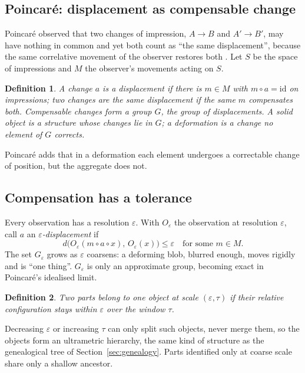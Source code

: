 \documentclass[11pt]{article}
\newtheorem{definition}{Definition}
\theoremstyle{remark}
\begin{document}
\subsection{Poincar\'e: displacement as compensable change}

Poincar\'e observed that two changes of impression, $A\to B$ and $A'\to B'$, may have nothing in common and yet
both count as ``the same displacement'', because the same correlative movement of the observer restores both
\cite{Poincare1902}. Let $S$ be the space of impressions and $M$ the observer's movements acting on $S$.

\begin{definition}
A change $a$ is a \emph{displacement} if there is $m\in M$ with $m\circ a=\mathrm{id}$ on impressions; two
changes are the same displacement if the same $m$ compensates both. Compensable changes form a group $G$, the
group of displacements. A \emph{solid object} is a structure whose changes lie in $G$; a \emph{deformation} is
a change no element of $G$ corrects.
\end{definition}

\noindent Poincar\'e adds that in a deformation each element undergoes a correctable change of position, but
the aggregate does not.

\subsection{Compensation has a tolerance}

Every observation has a resolution $\varepsilon$. With $O_\varepsilon$ the observation at resolution
$\varepsilon$, call $a$ an \emph{$\varepsilon$-displacement} if
\begin{equation}
  d\bigl(O_\varepsilon(m\circ a\circ x),\,O_\varepsilon(x)\bigr)\le\varepsilon\quad\text{for some }m\in M.
\end{equation}
The set $G_\varepsilon$ grows as $\varepsilon$ coarsens: a deforming blob, blurred enough, moves rigidly and is
``one thing''. $G_\varepsilon$ is only an approximate group, becoming exact in Poincar\'e's idealised limit.

\begin{definition}
Two parts belong to \emph{one object at scale $(\varepsilon,\tau)$} if their relative configuration stays within
$\varepsilon$ over the window $\tau$.
\end{definition}

\noindent Decreasing $\varepsilon$ or increasing $\tau$ can only split such objects, never merge them, so the
objects form an ultrametric hierarchy, the same kind of structure as the genealogical tree of
Section~\ref{sec:genealogy}. Parts identified only at coarse scale share only a shallow ancestor.
\end{document}
